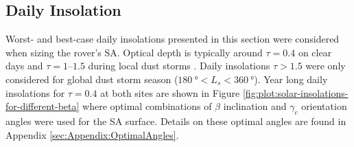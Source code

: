 \subsection{Daily Insolation}
Worst- and best-case daily insolations presented in this section were considered when sizing the rover's \ac{SA}. Optical depth is typically around $\tau = 0.4$ on clear days  and $\tau = 1–1.5$ during local dust storms . Daily insolations $\tau > 1.5$ were only considered for global dust storm season ($\SI{180}{\degree} < L_{s} < \SI{360}{\degree}$). Year long daily insolations for $\tau = 0.4$ at both sites are shown in Figure \ref{fig:plot:solar-insolations-for-different-beta} where optimal combinations of $\beta$ inclination and $\gamma_c$ orientation angles were used for the \ac{SA} surface. Details on these optimal angles are found in Appendix \ref{sec:Appendix:OptimalAngles}.

